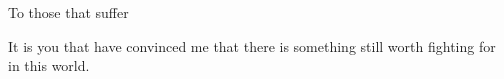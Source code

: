 \documentclass{ucbthesis}
\begin{document}


\maketitle
\approvalpage
\copyrightpage



\begin{frontmatter}

\begin{dedication}
\null\vfil
\begin{center}
To those that suffer\\\vspace{12pt}

It is you that have convinced me that there is something still worth
fighting for in this world.

\end{center}
\vfil\null
\end{dedication}


\tableofcontents
\clearpage
\listoffigures
\clearpage
\listoftables


  


\end{frontmatter}

\pagestyle{headings}







\printbibliography
\begin{appendices}
  
\end{appendices}
\end{document}
